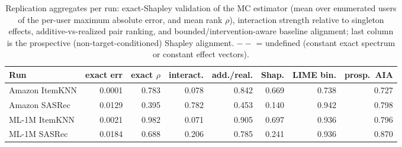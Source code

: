 \begin{table}[!htbp]\centering\scriptsize\setlength{\tabcolsep}{2.5pt}
\caption{Replication aggregates per run: exact-Shapley validation of the
MC estimator (mean over enumerated users of the per-user maximum absolute
error, and mean rank $\rho$),
interaction strength relative to singleton effects, additive-vs-realized pair
ranking, and bounded/intervention-aware baseline alignment; last column is the
prospective (non-target-conditioned) Shapley alignment. $--$ = undefined
(constant exact spectrum or constant effect vectors).}
\label{tab:review3}
\begin{tabular}{@{}lrrrrrrr@{}}
\toprule
Run & exact err & exact $\rho$ & interact. & add./real. & Shap. & LIME bin. & prosp.\ AIA \\
\midrule
Amazon ItemKNN & 0.0001 & 0.783 & 0.078 & 0.842 & 0.669 & 0.738 & 0.727 \\
Amazon SASRec & 0.0129 & 0.395 & 0.782 & 0.453 & 0.140 & 0.942 & 0.798 \\
ML-1M ItemKNN & 0.0021 & 0.982 & 0.071 & 0.905 & 0.697 & 0.936 & 0.796 \\
ML-1M SASRec & 0.0184 & 0.688 & 0.206 & 0.785 & 0.241 & 0.936 & 0.870 \\
\bottomrule
\end{tabular}
\end{table}